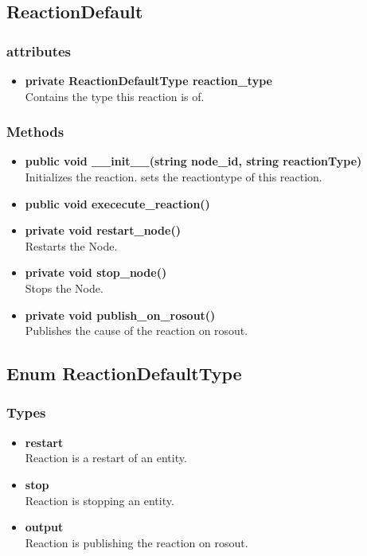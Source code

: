 \subsection{ReactionDefault}
\subsubsection{attributes}
\begin{itemize}
	\item \textbf{ private ReactionDefaultType reaction\_type}\\
		Contains the type this reaction is of.
\end{itemize}
\subsubsection{Methods}
\begin{itemize}
	\item \textbf{ public void \_\_init\_\_(string node\_id, string reactionType) }\\
		Initializes the reaction. sets the reactiontype of this reaction.
	\item \textbf{ public void exececute\_reaction() }\\
	\item \textbf{ private void restart\_node() }\\
		Restarts the Node.
	\item \textbf{ private void stop\_node() }\\
		Stops the Node.
	\item \textbf{ private void publish\_on\_rosout() }\\
		Publishes the cause of the reaction on rosout.
\end{itemize}


\subsection{Enum ReactionDefaultType}
\subsubsection{Types}
\begin{itemize}
	\item \textbf{ restart }\\
		Reaction is a restart of an entity.
	\item \textbf{ stop }\\
		Reaction is stopping an entity.
	\item \textbf{ output }\\
		Reaction is publishing the reaction on rosout.
\end{itemize}


